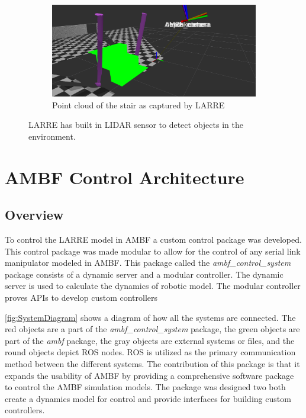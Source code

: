 \begin{figure}[h]
\begin{subfigure}{.5\linewidth}
        \end{subfigure}\\[1ex]
    \begin{subfigure}{\linewidth}
        \centering
        \includegraphics[scale=0.15]{images/sim/point_cloud_stairs2.png}
        \caption{Point cloud of the stair as captured by LARRE}
        \label{fig:DEPTH}
    \end{subfigure}
   \caption[LIDAR built into LARREs hip]{LARRE has built in LIDAR sensor to detect objects in the environment.}
   \label{fig:sensors}
\end{figure}
 
 
 
 \section{AMBF Control Architecture}
 \label{sec:controlarchitecture}
 
 \subsection{Overview}
 
 To control the LARRE model in AMBF a custom control package was developed. This control package was made modular to allow for the control of any serial link manipulator modeled in AMBF. This package called the \textit{ambf\_control\_system} package consists of a dynamic server and a modular controller. The dynamic server is used to calculate the dynamics of robotic model. The modular controller proves APIs to develop custom controllers      
 
 \autoref{fig:SystemDiagram} shows a diagram of how all the systems are connected. The red objects are a part of the \textit{ambf\_control\_system} package, the green objects are part of the \textit{ambf} package, the gray objects are external systems or files, and the round objects depict ROS nodes. ROS is utilized as the primary communication method between the different systems. The contribution of this package is that it expands the usability of AMBF by providing a comprehensive software package to control the AMBF simulation models. The package was designed two both create a dynamics model for control and provide interfaces for building custom controllers. 
 
